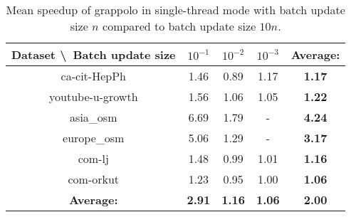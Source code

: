 \begin{table}[H]
	\centering
	\begin{tabular}{|c|c|c|c|c|}
		\hline
		Dataset \textbackslash\ Batch update size& $10^{-1}$ & $10^{-2}$ & $10^{-3}$ & \textbf{Average:} \\
		\hline
		ca-cit-HepPh & 1.46 & 0.89 & 1.17 & \textbf{1.17} \\
		\hline
		youtube-u-growth & 1.56 & 1.06 & 1.05 & \textbf{1.22} \\
		\hline
		asia\_osm & 6.69 & 1.79 & - & \textbf{4.24} \\
		\hline
		europe\_osm & 5.06 & 1.29 & - & \textbf{3.17} \\
		\hline
		com-lj & 1.48 & 0.99 & 1.01 & \textbf{1.16} \\
		\hline
		com-orkut & 1.23 & 0.95 & 1.00 & \textbf{1.06} \\
		\hline
		\textbf{Average:} & \textbf{2.91} & \textbf{1.16} & \textbf{1.06} & \textbf{2.00} \\
		\hline
	\end{tabular}
\caption{Mean speedup of grappolo in single-thread mode with batch update size $n$ compared to batch update size $10 n$.}
\label{T:time speedup for grappolo}
\end{table}